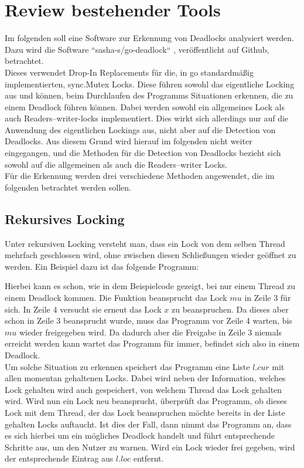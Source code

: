 \chapter{Review bestehender Tools}
Im folgenden soll eine Software zur Erkennung von Deadlocks analysiert werden.
Dazu wird die Software ``sasha-s/go-deadlock`` \cite{sasha-s}, veröffentlicht 
auf Github, betrachtet.\\
Dieses verwendet Drop-In Replacements für die, in go standardmäßig 
implementierten, sync.Mutex Locks. Diese führen sowohl das eigentliche 
Locking aus und können, beim Durchlaufen des Programms Situationen erkennen, 
die zu einem Deadlock führen können. Dabei werden sowohl ein allgemeines Lock 
als auch Readers–writer-locks implementiert. Dies wirkt sich allerdings nur auf
die Anwendung des eigentlichen Lockings aus, nicht aber auf die Detection von 
Deadlocks. Aus diesem Grund wird hierauf im folgenden nicht weiter eingegangen, 
und die Methoden für die Detection von Deadlocks bezieht sich sowohl auf die
allgemeinen als auch die Readers–writer Locks.\\
Für die Erkennung werden drei verschiedene Methoden angewendet, die im folgenden
betrachtet werden sollen.

\section{Rekursives Locking}
Unter rekursiven Locking versteht man, dass ein Lock von dem selben Thread 
mehrfach geschlossen wird, ohne zwischen diesen Schließungen wieder geöffnet zu
werden. Ein Beispiel dazu ist das folgende Programm:
\begin{figure}[H]
    
\end{figure}
Hierbei kann es schon, wie in dem Beispielcode gezeigt, bei nur einem Thread
zu einem Deadlock kommen. Die Funktion beansprucht das Lock $mu$ in Zeile $3$ 
für sich. In Zeile 4 versucht sie erneut das Lock $x$ zu beanspruchen. Da dieses
aber schon in Zeile 3 beansprucht wurde, muss das Programm vor Zeile 4 warten, 
bis $mu$ wieder freigegeben wird. Da dadurch aber die Freigabe in Zeile 3 
niemals erreicht werden kann wartet das Programm für immer, befindet sich also 
in einem Deadlock.\\
Um solche Situation zu erkennen speichert das Programm eine Liste $l.cur$ mit 
allen momentan gehaltenen 
Locks. Dabei wird neben der Information, welches Lock gehalten wird auch 
gespeichert, von welchem Thread das Lock gehalten wird. Wird nun ein Lock neu 
beansprucht, überprüft 
das Programm, ob dieses Lock mit dem Thread, der das Lock beanspruchen möchte 
bereits in der Liste gehalten Locks auftaucht. Ist dies der Fall, dann nimmt das
Programm an, dass es sich hierbei um ein mögliches Deadlock handelt und führt 
entsprechende Schritte aus, um den Nutzer zu warnen. Wird ein Lock wieder frei
gegeben, wird der entsprechende Eintrag aus $l.loc$ entfernt.

